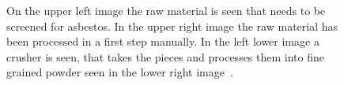 \begin{figure}[h]
\centering
\caption{On the upper left image the raw material is seen that needs to be screened for asbestos. In the upper right image the raw material has been processed in a first step manually. In the left lower image a crusher is seen, that takes the pieces and processes them into fine grained powder seen in the lower right image~\cite{mohammed2015}. }
\label{fig:sampleprep}
\end{figure}

